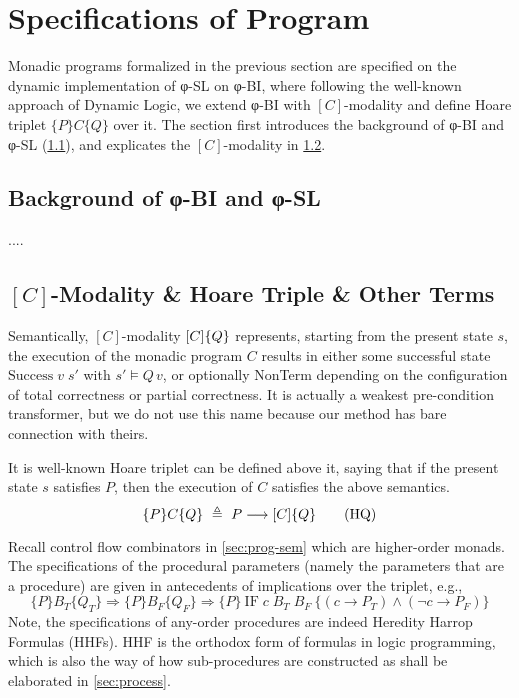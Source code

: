 \section{Specifications of Program}

Monadic programs formalized in the previous section are specified on the dynamic implementation of φ-SL on φ-BI, where following the well-known approach of Dynamic Logic, we extend φ-BI with $[C]$-modality and define Hoare triplet $\{P\}C\{Q\}$ over it.
The section first introduces the background of φ-BI and φ-SL (\cref{sec:background}), and explicates the $[C]$-modality in \cref{sec:wp}.

\subsection{Background of φ-BI and φ-SL}\label{sec:background}

....


\subsection{$[C]$-Modality \& Hoare Triple \& Other Terms}\label{sec:wp}
Semantically, $[C]$-modality $[C]\{Q\}$ represents,
starting from the present state $s$,
the execution of the monadic program $C$
results in either some successful state $\mathrm{Success}\;v\;s'$ with $s' ⊨ Q\,v$,
or optionally NonTerm depending on the configuration of total correctness or partial correctness.
It is actually a weakest pre-condition transformer, but we do not use this name because our method has bare connection with theirs.

It is well-known Hoare triplet can be defined above it,
saying that if the present state $s$ satisfies $P$, then the execution of $C$ satisfies the above semantics.
\[\{P\}C\{Q\} ~\triangleq~ P \longrightarrow [C]\{Q\} \tag{HQ}\label{def:HQ}\]

Recall control flow combinators in \cref{sec:prog-sem} which are higher-order monads.
The specifications of the procedural parameters (namely the parameters that are a procedure) are given in antecedents of implications over the triplet, e.g.,
\[ \{P\}B_T\{Q_T\} \Longrightarrow \{P\}B_F\{Q_F\} \Longrightarrow
      \{P\}~\mathrm{IF}\;c\;B_T\;B_F~\{(c \longrightarrow P_T) \land (¬c \longrightarrow P_F)\} \]
Note, the specifications of any-order procedures are indeed Heredity Harrop Formulas (HHFs).
HHF is the orthodox form of formulas in logic programming, which is also the way of how sub-procedures are constructed as shall be elaborated in \cref{sec:process}.

